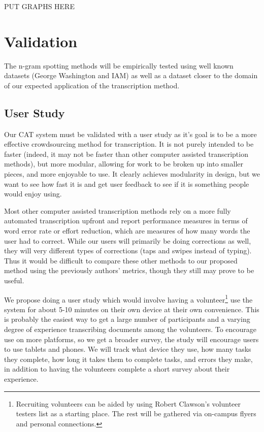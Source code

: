 \documentclass[ms]{byuprop}
\begin{document}
PUT GRAPHS HERE

\section{Validation}
The n-gram spotting methods will be empirically tested using well known datasets (George Washington\cite{GW} and IAM\cite{IAM}) as well as a dataset closer to the domain of our expected application of the transcription method.

\subsection{User Study}

Our CAT system must be validated with a user study as it's goal is to be a more effective crowdsourcing method for transcription. It is not purely intended to be faster (indeed, it may not be faster than other computer assisted transcription methods), but more modular, allowing for work to be broken up into smaller pieces, and more enjoyable to use. It clearly achieves modularity in design, but we want to see how fast it is and get user feedback to see if it is something people would enjoy using.

Most other computer assisted transcription methods rely on a more fully automated transcription upfront and report performance measures in terms of word error rate or effort reduction, which are measures of how many words the user had to correct. While our users will primarily be doing corrections as well, they will very different types of corrections (taps and swipes instead of typing). Thus it would be difficult to compare these other methods to our proposed method using the previously authors' metrics, though they still may prove to be useful.

We propose doing a user study which would involve having a volunteer\footnote{Recruiting volunteers can be aided by using Robert Clawson's volunteer testers list as a starting place. The rest will be gathered via on-campus flyers and personal connections.} use the system for about 5-10 minutes on their own device at their own convenience. This is probably the easiest way to get a large number of participants and a varying degree of experience transcribing documents among the volunteers. To encourage use on more platforms, so we get a broader survey, the study will encourage users to use tablets and phones.
We will track what device they use, how many tasks they complete, how long it takes them to complete tasks, and errors they make, in addition to having the volunteers complete a short survey about their experience.
\end{document}
